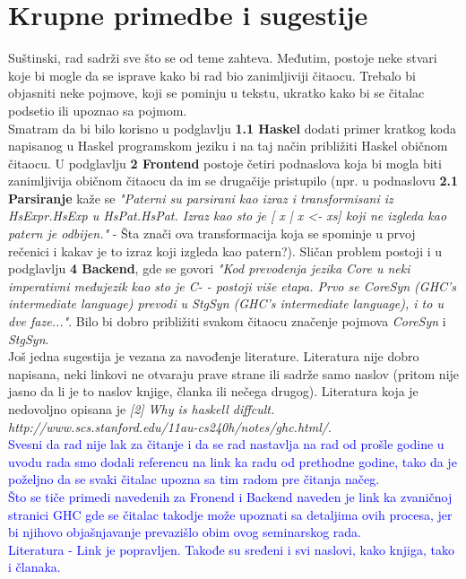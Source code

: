 \documentclass[a4paper]{report}
\newcommand{\odgovor}[1]{\textcolor{blue}{#1}}
\begin{document}
	\section{Krupne primedbe i sugestije}
	Suštinski, rad sadrži sve što se od teme zahteva. Međutim, postoje neke stvari koje bi mogle da se isprave kako bi rad bio zanimljiviji čitaocu. Trebalo bi objasniti neke pojmove, koji se pominju u tekstu, ukratko kako bi se čitalac podsetio ili upoznao sa pojmom. \\ Smatram da bi bilo korisno u podglavlju \textbf{1.1 Haskel} dodati primer kratkog koda napisanog u Haskel programskom jeziku i na taj način približiti Haskel običnom čitaocu. U podglavlju \textbf{2 Frontend} postoje četiri podnaslova koja bi mogla biti zanimljivija običnom čitaocu da im se drugačije pristupilo (npr. u podnaslovu \textbf{2.1 Parsiranje} kaže se \textit{"Paterni su parsirani kao izraz i transformisani iz HsExpr.HsExp u HsPat.HsPat. Izraz kao sto je [ x | x <- xs] koji ne izgleda kao patern je odbijen."} - Šta znači ova transformacija koja se spominje u prvoj rečenici i kakav je to izraz koji izgleda kao patern?). Sličan problem postoji i u podglavlju \textbf{4 Backend}, gde se govori \textit{"Kod prevodenja jezika Core u neki imperativni međujezik kao sto je
		C- - postoji više etapa. Prvo se CoreSyn (GHC's intermediate language) prevodi u StgSyn (GHC's intermediate language), i to u dve faze..."}. Bilo bi dobro približiti svakom čitaocu značenje pojmova \textit{CoreSyn} i \textit{StgSyn}.\\
	Još jedna sugestija je vezana za navođenje literature. Literatura nije dobro napisana, neki linkovi ne otvaraju prave strane ili sadrže samo naslov (pritom nije jasno da li je to naslov knjige, članka ili nečega drugog). Literatura koja je nedovoljno opisana je \textit{[2] Why is haskell diffcult. http://www.scs.stanford.edu/11au-cs240h/notes/ghc.html/}.\\ 
	\odgovor{Svesni da rad nije lak za čitanje i da se rad nastavlja na rad od prošle godine u uvodu rada smo dodali referencu na link ka radu od prethodne godine, tako da je poželjno da se svaki čitalac upozna sa tim radom pre čitanja načeg.\\Što se tiče primedi navedenih za Fronend i Backend naveden je link ka zvaničnoj stranici GHC gde se čitalac takodje može upoznati sa detaljima ovih procesa, jer bi njihovo objašnjavanje prevazišlo obim ovog seminarskog rada.\\Literatura - Link je popravljen. Takođe su sređeni i svi naslovi, kako knjiga, tako i članaka.}
	
\end{document}
